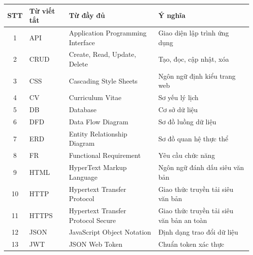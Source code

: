 \documentclass[a4paper,11pt,oneside]{book}
\begin{document}
	\begin{table}[H]
		\hspace*{-1.0cm}
		\small
		\renewcommand{\arraystretch}{1.3}
		
		\begin{tabular}{|c|p{1.3cm}|p{5.5cm}|p{5.0cm}|}
			\hline
			\textbf{STT} & \textbf{Từ viết tắt} & \textbf{Từ đầy đủ} & \textbf{Ý nghĩa} \\
			\hline
			
			1 & API & Application Programming Interface
			& Giao diện lập trình ứng dụng \\
			\hline
			
			2 & CRUD & Create, Read, Update, Delete
			& Tạo, đọc, cập nhật, xóa \\
			\hline
			
			3 & CSS & Cascading Style Sheets
			& Ngôn ngữ định kiểu trang web \\
			\hline
			
			4 & CV & Curriculum Vitae
			& Sơ yếu lý lịch \\
			\hline
			
			5 & DB & Database
			& Cơ sở dữ liệu \\
			\hline
			
			6 & DFD & Data Flow Diagram
			& Sơ đồ luồng dữ liệu \\
			\hline
			
			7 & ERD & Entity Relationship Diagram
			& Sơ đồ quan hệ thực thể \\
			\hline
			
			8 & FR & Functional Requirement
			& Yêu cầu chức năng \\
			\hline
			
			9 & HTML & HyperText Markup Language
			& Ngôn ngữ đánh dấu siêu văn bản \\
			\hline
			
			10 & HTTP & Hypertext Transfer Protocol
			& Giao thức truyền tải siêu văn bản \\
			\hline
			
			11 & HTTPS & Hypertext Transfer Protocol Secure
			& Giao thức truyền tải siêu văn bản an toàn \\
			\hline
			
			12 & JSON & JavaScript Object Notation
			& Định dạng trao đổi dữ liệu \\
			\hline
			
			13 & JWT & JSON Web Token
			& Chuẩn token xác thực \\
			\hline
			

\end{tabular}
\end{table}
\end{document}
